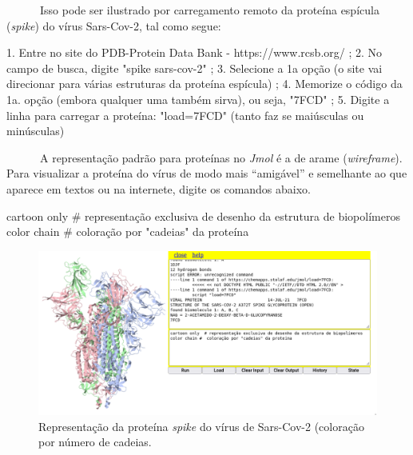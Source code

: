\documentclass[
  letterpaper,
  DIV=11,
  numbers=noendperiod]{scrreprt}
\newenvironment{Shaded}{\begin{snugshade}}{\end{snugshade}}
\newcommand{\CommentTok}[1]{\textcolor[rgb]{0.37,0.37,0.37}{#1}}
\newcommand{\DecValTok}[1]{\textcolor[rgb]{0.68,0.00,0.00}{#1}}
\newcommand{\ErrorTok}[1]{\textcolor[rgb]{0.68,0.00,0.00}{#1}}
\newcommand{\FloatTok}[1]{\textcolor[rgb]{0.68,0.00,0.00}{#1}}
\newcommand{\NormalTok}[1]{\textcolor[rgb]{0.00,0.23,0.31}{#1}}
\newcommand{\SpecialCharTok}[1]{\textcolor[rgb]{0.37,0.37,0.37}{#1}}
\newcommand{\StringTok}[1]{\textcolor[rgb]{0.13,0.47,0.30}{#1}}
\begin{document}
~~~~~~Isso pode ser ilustrado por carregamento remoto da proteína
espícula (\emph{spike}) do vírus Sars-Cov-2, tal como segue:

\begin{Shaded}
\begin{Highlighting}[]
\FloatTok{1.}\NormalTok{ Entre no site do PDB}\SpecialCharTok{{-}}\NormalTok{Protein Data Bank }\SpecialCharTok{{-}}\NormalTok{ https}\SpecialCharTok{:}\ErrorTok{//}\NormalTok{www.rcsb.org}\SpecialCharTok{/}\NormalTok{ ; }
\FloatTok{2.}\NormalTok{ No campo de busca, digite }\StringTok{"spike sars{-}cov{-}2"}\NormalTok{ ;}
\FloatTok{3.}\NormalTok{ Selecione a }\DecValTok{1}\NormalTok{a opção (o site vai direcionar para várias estruturas da proteína espícula) ;}
\FloatTok{4.}\NormalTok{ Memorize o código da }\DecValTok{1}\NormalTok{a. opção (embora qualquer uma também sirva), ou seja, }\StringTok{"7FCD"}\NormalTok{ ;}
\FloatTok{5.}\NormalTok{ Digite a linha para carregar a proteína}\SpecialCharTok{:} \StringTok{"load=7FCD"}\NormalTok{ (tanto faz se maiúsculas ou minúsculas)}
\end{Highlighting}
\end{Shaded}

~~~~~~A representação padrão para proteínas no \emph{Jmol} é a de arame
(\emph{wireframe}). Para visualizar a proteína do vírus de modo mais
``amigável'' e semelhante ao que aparece em textos ou na internete,
digite os comandos abaixo.

\begin{Shaded}
\begin{Highlighting}[]
\NormalTok{cartoon only  }\CommentTok{\# representação exclusiva de desenho da estrutura de biopolímeros}
\NormalTok{color chain }\CommentTok{\#  coloração por "cadeias" da proteína}
\end{Highlighting}
\end{Shaded}

\begin{figure}[H]

{\centering \includegraphics{spike.png}

}

\caption{Representação da proteína \emph{spike} do vírus de Sars-Cov-2
(coloração por número de cadeias.}

\end{figure}%
\end{document}
